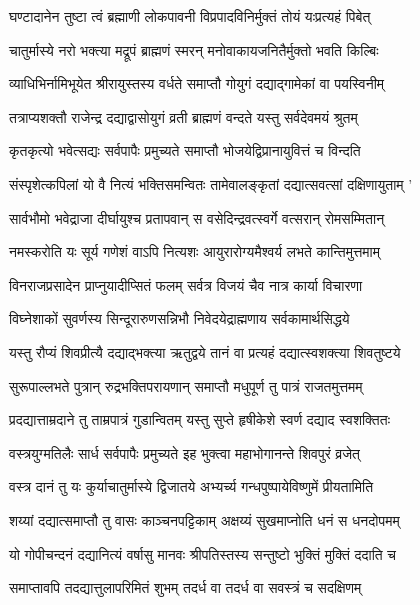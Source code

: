 \twolineshloka
{घण्टादानेन तुष्टा त्वं ब्रह्माणी लोकपावनी}
{विप्रपादविनिर्मुक्तं तोयं यःप्रत्यहं पिबेत्} %

\twolineshloka
{चातुर्मास्ये नरो भक्त्या मद्रूपं ब्राह्मणं स्मरन्}
{मनोवाकायजनितैर्मुक्तो भवति किल्बिः} %

\twolineshloka
{व्याधिभिर्नामिभूयेत श्रीरायुस्तस्य वर्धते}
{समाप्तौ गोयुगं दद्याद्गामेकां वा पयस्विनीम्} %

\twolineshloka
{तत्राप्यशक्तौ राजेन्द्र दद्याद्वासोयुगं व्रती}
{ब्राह्मणं वन्दते यस्तु सर्वदेवमयं श्रुतम्} %

\twolineshloka
{कृतकृत्यो भवेत्सद्यः सर्वपापैः प्रमुच्यते}
{समाप्तौ भोजयेद्विप्रानायुवित्तं च विन्दति} %

\twolineshloka
{संस्पृशेत्कपिलां यो वै नित्यं भक्तिसमन्वितः}
{तामेवालङ्कृतां दद्यात्सवत्सां दक्षिणायुताम् '} %

\twolineshloka
{सार्वभौमो भवेद्राजा दीर्घायुश्च प्रतापवान्}
{स वसेदिन्द्रवत्स्वर्गे वत्सरान् रोमसम्मितान्} %

\twolineshloka
{नमस्करोति यः सूर्य गणेशं वाऽपि नित्यशः}
{आयुरारोग्यमैश्वर्य लभते कान्तिमुत्तमाम्} %

\twolineshloka
{विनराजप्रसादेन प्राप्नुयादीप्सितं फलम्}
{सर्वत्र विजयं चैव नात्र कार्या विचारणा} %

\twolineshloka
{विघ्नेशाकों सुवर्णस्य सिन्दूरारुणसन्निभौ}
{निवेदयेद्राह्मणाय सर्वकामार्थसिद्धये} %

\twolineshloka
{यस्तु रौप्यं शिवप्रीत्यै दद्याद्भक्त्या ऋतुद्वये}
{तानं वा प्रत्यहं दद्यात्स्वशक्त्या शिवतुष्टये} %

\twolineshloka
{सुरूपाल्लभते पुत्रान् रुद्रभक्तिपरायणान्}
{समाप्तौ मधुपूर्ण तु पात्रं राजतमुत्तमम्} %

\twolineshloka
{प्रदद्यात्ताम्रदाने तु ताम्रपात्रं गुडान्वितम्}
{यस्तु सुप्ते हृषीकेशे स्वर्ण दद्याद स्वशक्तितः} %

\twolineshloka
{वस्त्रयुग्मतिलैः सार्ध सर्वपापैः प्रमुच्यते}
{इह भुक्त्वा महाभोगानन्ते शिवपुरं व्रजेत्} %

\twolineshloka
{वस्त्र दानं तु यः कुर्याचातुर्मास्ये द्विजातये}
{अभ्यर्च्य गन्धपुष्पायेविष्णुमें प्रीयतामिति} %

\twolineshloka
{शय्यां दद्यात्समाप्तौ तु वासः काञ्चनपट्टिकाम्}
{अक्षय्यं सुखमाप्नोति धनं स धनदोपमम्} %

\twolineshloka
{यो गोपीचन्दनं दद्यानित्यं वर्षासु मानवः}
{श्रीपतिस्तस्य सन्तुष्टो भुक्तिं मुक्तिं ददाति च} %

\twolineshloka
{समाप्तावपि तदद्यात्तुलापरिमितं शुभम्}
{तदर्ध वा तदर्ध वा सवस्त्रं च सदक्षिणम्} %

